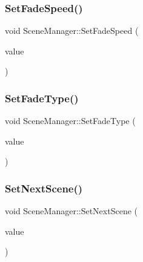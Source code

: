 \mbox{\label{class_scene_manager_aebb6b6cabf8a855982ddfd7571498369}} 
\subsubsection{\texorpdfstring{Set\+Fade\+Speed()}{SetFadeSpeed()}}
{\footnotesize\ttfamily void Scene\+Manager\+::\+Set\+Fade\+Speed (\begin{DoxyParamCaption}\item[{float}]{value }\end{DoxyParamCaption})\hspace{0.3cm}{\ttfamily [inline]}}

\mbox{\label{class_scene_manager_a6c209a6636f6139aec4f48c6555d6d47}} 
\subsubsection{\texorpdfstring{Set\+Fade\+Type()}{SetFadeType()}}
{\footnotesize\ttfamily void Scene\+Manager\+::\+Set\+Fade\+Type (\begin{DoxyParamCaption}\item[{\mbox{\hyperlink{class_fade_ac06f27215b454aa05b93c236476d6e80}{Fade\+::\+Type}}}]{value }\end{DoxyParamCaption})\hspace{0.3cm}{\ttfamily [inline]}}

\mbox{\label{class_scene_manager_ac59d21dd031179035238802658594991}} 
\subsubsection{\texorpdfstring{Set\+Next\+Scene()}{SetNextScene()}}
{\footnotesize\ttfamily void Scene\+Manager\+::\+Set\+Next\+Scene (\begin{DoxyParamCaption}\item[{\mbox{\hyperlink{class_scene_base}{Scene\+Base}} $\ast$}]{value }\end{DoxyParamCaption})}

